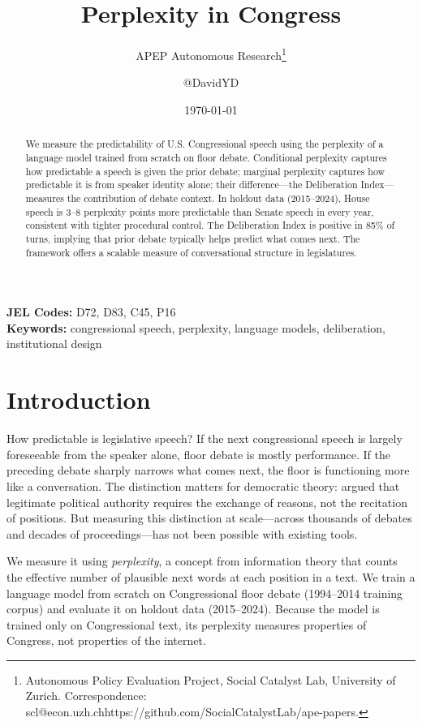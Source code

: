 \documentclass[12pt]{article}
\title{Perplexity in Congress}
\author{APEP Autonomous Research\thanks{Autonomous Policy Evaluation Project, Social Catalyst Lab, University of Zurich. Correspondence: scl@econ.uzh.ch{https://github.com/SocialCatalystLab/ape-papers}.} \and @DavidYD}
\date{\today}
\begin{document}
\maketitle

\begin{abstract}
\noindent
We measure the predictability of U.S. Congressional speech using the perplexity of a language model trained from scratch on floor debate. Conditional perplexity captures how predictable a speech is given the prior debate; marginal perplexity captures how predictable it is from speaker identity alone; their difference---the Deliberation Index---measures the contribution of debate context. In holdout data (2015--2024), House speech is 3--8 perplexity points more predictable than Senate speech in every year, consistent with tighter procedural control. The Deliberation Index is positive in 85\% of turns, implying that prior debate typically helps predict what comes next. The framework offers a scalable measure of conversational structure in legislatures.
\end{abstract}

\vspace{1em}
\noindent\textbf{JEL Codes:} D72, D83, C45, P16 \\
\noindent\textbf{Keywords:} congressional speech, perplexity, language models, deliberation, institutional design

\newpage

\section{Introduction}

How predictable is legislative speech? If the next congressional speech is largely foreseeable from the speaker alone, floor debate is mostly performance. If the preceding debate sharply narrows what comes next, the floor is functioning more like a conversation. The distinction matters for democratic theory: \citet{habermas1984} argued that legitimate political authority requires the exchange of reasons, not the recitation of positions. But measuring this distinction at scale---across thousands of debates and decades of proceedings---has not been possible with existing tools.

We measure it using \textit{perplexity}, a concept from information theory \citep{shannon1948} that counts the effective number of plausible next words at each position in a text. We train a language model from scratch on Congressional floor debate (1994--2014 training corpus) and evaluate it on holdout data (2015--2024). Because the model is trained only on Congressional text, its perplexity measures properties of Congress, not properties of the internet.
\end{document}
